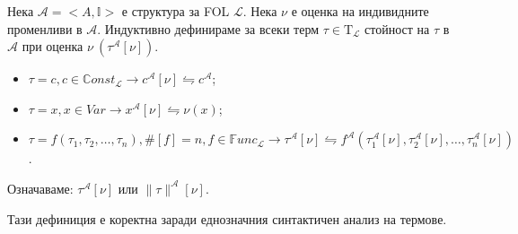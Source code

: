 \documentclass{article}
\newcommand{\Tau}{\mathrm{T}}
\begin{document}
\begin{mydef}
$\ $

Нека $\mathcal{A} = <A, \mathbb{I}>$ е структура за FOL $\mathcal{L}$. Нека $\nu$ е оценка на индивидните променливи в $\mathcal{A}$. Индуктивно дефинираме за всеки терм $\tau \in \Tau_\mathcal{L}$ стойност на $\tau$ в $\mathcal{A}$ при оценка $\nu\ (\tau^\mathcal{A}[\nu])$.

\begin{itemize}
\item $\tau = c, c \in \mathbb{C}onst_\mathcal{L} \longrightarrow c^\mathcal{A}[\nu] \leftrightharpoons c^\mathcal{A}$;
\item $\tau = x, x \in Var \longrightarrow x^\mathcal{A}[\nu] \leftrightharpoons \nu(x)$;
\item $\tau = f(\tau_1, \tau_2, \ldots, \tau_n), \#[f] = n, f \in \mathbb{F}unc_\mathcal{L} \longrightarrow \tau^\mathcal{A}[\nu] \leftrightharpoons f^\mathcal{A}(\tau^\mathcal{A}_1[\nu], \tau^\mathcal{A}_2[\nu], \ldots, \tau^\mathcal{A}_n[\nu])$.
\end{itemize}

\begin{remark}
Означаваме: $\tau^\mathcal{A}[\nu]$ или $\|\tau\|^\mathcal{A}[\nu]$.
\end{remark}

\begin{remark}
Тази дефиниция е коректна заради еднозначния синтактичен анализ на термове.
\end{remark}

\end{mydef}
\end{document}
